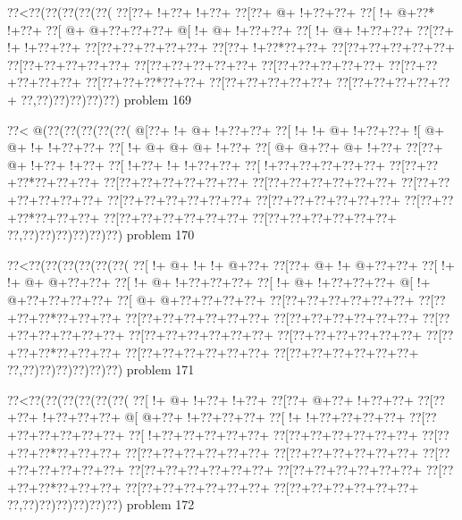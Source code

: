 \vbox{\vbox{\goo
\0??<\0??(\0??(\0??(\0??(\0??(
\0??[\0??+\- !+\0??+\- !+\0??+
\0??[\0??+\- @+\- !+\0??+\0??+
\0??[\- !+\- @+\0??*\- !+\0??+
\0??[\- @+\- @+\0??+\0??+\0??+
\- @[\- !+\- @+\- !+\0??+\0??+
\0??[\- !+\- @+\- !+\0??+\0??+
\0??[\0??+\- !+\- !+\0??+\0??+
\0??[\0??+\0??+\0??+\0??+\0??+
\0??[\0??+\- !+\0??*\0??+\0??+
\0??[\0??+\0??+\0??+\0??+\0??+
\0??[\0??+\0??+\0??+\0??+\0??+
\0??[\0??+\0??+\0??+\0??+\0??+
\0??[\0??+\0??+\0??+\0??+\0??+
\0??[\0??+\0??+\0??+\0??+\0??+
\0??[\0??+\0??+\0??*\0??+\0??+
\0??[\0??+\0??+\0??+\0??+\0??+
\0??[\0??+\0??+\0??+\0??+\0??+
\0??,\0??)\0??)\0??)\0??)\0??)
}
\hfil problem 169\hfil\break
}

\vbox{\vbox{\goo
\0??<\- @(\0??(\0??(\0??(\0??(\0??(
\- @[\0??+\- !+\- @+\- !+\0??+\0??+
\0??[\- !+\- !+\- @+\- !+\0??+\0??+
\- ![\- @+\- @+\- !+\- !+\0??+\0??+
\0??[\- !+\- @+\- @+\- @+\- !+\0??+
\0??[\- @+\- @+\0??+\- @+\- !+\0??+
\0??[\0??+\- @+\- !+\0??+\- !+\0??+
\0??[\- !+\0??+\- !+\- !+\0??+\0??+
\0??[\- !+\0??+\0??+\0??+\0??+\0??+
\0??[\0??+\0??+\0??*\0??+\0??+\0??+
\0??[\0??+\0??+\0??+\0??+\0??+\0??+
\0??[\0??+\0??+\0??+\0??+\0??+\0??+
\0??[\0??+\0??+\0??+\0??+\0??+\0??+
\0??[\0??+\0??+\0??+\0??+\0??+\0??+
\0??[\0??+\0??+\0??+\0??+\0??+\0??+
\0??[\0??+\0??+\0??*\0??+\0??+\0??+
\0??[\0??+\0??+\0??+\0??+\0??+\0??+
\0??[\0??+\0??+\0??+\0??+\0??+\0??+
\0??,\0??)\0??)\0??)\0??)\0??)\0??)
}
\hfil problem 170\hfil\break
}

\vbox{\vbox{\goo
\0??<\0??(\0??(\0??(\0??(\0??(\0??(
\0??[\- !+\- @+\- !+\- !+\- @+\0??+
\0??[\0??+\- @+\- !+\- @+\0??+\0??+
\0??[\- !+\- !+\- @+\- @+\0??+\0??+
\0??[\- !+\- @+\- !+\0??+\0??+\0??+
\0??[\- !+\- @+\- !+\0??+\0??+\0??+
\- @[\- !+\- @+\0??+\0??+\0??+\0??+
\0??[\- @+\- @+\0??+\0??+\0??+\0??+
\0??[\0??+\0??+\0??+\0??+\0??+\0??+
\0??[\0??+\0??+\0??*\0??+\0??+\0??+
\0??[\0??+\0??+\0??+\0??+\0??+\0??+
\0??[\0??+\0??+\0??+\0??+\0??+\0??+
\0??[\0??+\0??+\0??+\0??+\0??+\0??+
\0??[\0??+\0??+\0??+\0??+\0??+\0??+
\0??[\0??+\0??+\0??+\0??+\0??+\0??+
\0??[\0??+\0??+\0??*\0??+\0??+\0??+
\0??[\0??+\0??+\0??+\0??+\0??+\0??+
\0??[\0??+\0??+\0??+\0??+\0??+\0??+
\0??,\0??)\0??)\0??)\0??)\0??)\0??)
}
\hfil problem 171\hfil\break
}

\vbox{\vbox{\goo
\0??<\0??(\0??(\0??(\0??(\0??(\0??(
\0??[\- !+\- @+\- !+\0??+\- !+\0??+
\0??[\0??+\- @+\0??+\- !+\0??+\0??+
\0??[\0??+\0??+\- !+\0??+\0??+\0??+
\- @[\- @+\0??+\- !+\0??+\0??+\0??+
\0??[\- !+\- !+\0??+\0??+\0??+\0??+
\0??[\0??+\0??+\0??+\0??+\0??+\0??+
\0??[\- !+\0??+\0??+\0??+\0??+\0??+
\0??[\0??+\0??+\0??+\0??+\0??+\0??+
\0??[\0??+\0??+\0??*\0??+\0??+\0??+
\0??[\0??+\0??+\0??+\0??+\0??+\0??+
\0??[\0??+\0??+\0??+\0??+\0??+\0??+
\0??[\0??+\0??+\0??+\0??+\0??+\0??+
\0??[\0??+\0??+\0??+\0??+\0??+\0??+
\0??[\0??+\0??+\0??+\0??+\0??+\0??+
\0??[\0??+\0??+\0??*\0??+\0??+\0??+
\0??[\0??+\0??+\0??+\0??+\0??+\0??+
\0??[\0??+\0??+\0??+\0??+\0??+\0??+
\0??,\0??)\0??)\0??)\0??)\0??)\0??)
}
\hfil problem 172\hfil\break
}

